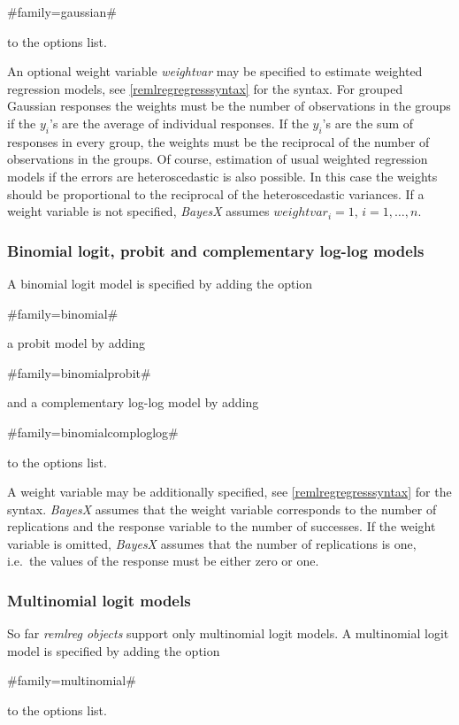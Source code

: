 #family=gaussian#

to the options list.

An optional weight variable {\em weightvar} may be specified to
estimate weighted regression models, see
\autoref{remlregregresssyntax} for the syntax. For grouped
Gaussian responses the weights must be the number of observations
in the groups if the $y_i$'s are the average of individual
responses. If the $y_i$'s are the sum of responses in every group,
the weights must be the reciprocal of the number of observations
in the groups. Of course, estimation of usual weighted regression
models if the errors are heteroscedastic is also possible. In this
case the weights should be proportional to the reciprocal of the
heteroscedastic variances. If a weight variable is not specified,
{\em BayesX} assumes $weightvar_i = 1$, $i=1,\dots,n$.

\subsubsection*{Binomial logit, probit and complementary log-log
models}

A binomial logit model is specified by adding the option

#family=binomial#

a probit model by adding

#family=binomialprobit#

and a complementary log-log model by adding

#family=binomialcomploglog#

to the options list.

A weight variable may be additionally specified, see
\autoref{remlregregresssyntax} for the syntax. {\em BayesX}
assumes that the weight variable corresponds to the number of
replications and the response variable to the number of successes.
If the weight variable is omitted, {\em BayesX} assumes that the
number of replications is one, i.e.~the values of the response
must be either zero or one.

\subsubsection*{Multinomial logit models}

So far {\em remlreg objects} support only multinomial logit
models. A multinomial logit model is specified by adding the
option

#family=multinomial#

to the options list.

